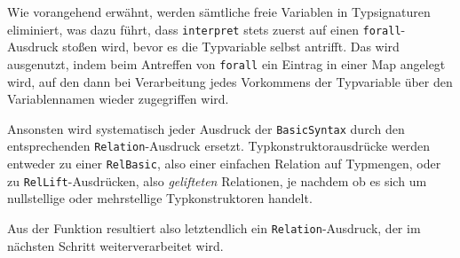 Wie vorangehend erwähnt, werden sämtliche freie Variablen in Typsignaturen eliminiert, was dazu führt, dass \texttt{interpret}
stets zuerst auf einen \texttt{forall}-Ausdruck stoßen wird, bevor es die Typvariable selbst antrifft. Das wird ausgenutzt, indem
beim Antreffen von \texttt{forall} ein Eintrag in einer Map angelegt wird, auf den dann bei Verarbeitung jedes Vorkommens der
Typvariable über den Variablennamen wieder zugegriffen wird.

Ansonsten wird systematisch jeder Ausdruck der \texttt{BasicSyntax} durch den entsprechenden \texttt{Relation}-Ausdruck
ersetzt. Typkonstruktorausdrücke werden entweder zu einer \texttt{RelBasic}, also einer einfachen Relation auf Typmengen,
oder zu \texttt{RelLift}-Ausdrücken, also \textit{gelifteten} Relationen, je nachdem ob es sich um nullstellige oder mehrstellige
Typkonstruktoren handelt.

Aus der Funktion resultiert also letztendlich ein \texttt{Relation}-Ausdruck, der im nächsten Schritt weiterverarbeitet wird.




%
%
%
%


